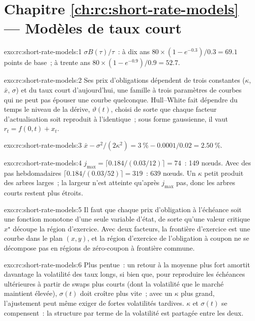 \section*{Chapitre \ref{ch:rc:short-rate-models} --- Modèles de taux court}

\begin{solution}{exo:rc:short-rate-models:1}
$\sigma B(\tau)/\tau$~: à dix ans $80\times(1-e^{-0.3})/0.3 = 69.1$ points de base~; à
trente ans $80\times(1-e^{-0.9})/0.9 = 52.7$.
\end{solution}

\begin{solution}{exo:rc:short-rate-models:2}
Ses prix d'obligations dépendent de trois constantes ($\kappa$, $\bar x$, $\sigma$) et du taux court
d'aujourd'hui, une famille à trois paramètres de courbes qui ne peut pas épouser une courbe quelconque.
Hull--White fait dépendre du temps le niveau de la dérive, $\vartheta(t)$, choisi de sorte
que chaque facteur d'actualisation soit reproduit à l'identique~; sous forme gaussienne, il vaut $r_t =
f(0,t)+x_t$.
\end{solution}

\begin{solution}{exo:rc:short-rate-models:3}
$\bar x-\sigma^2/(2\kappa^2) = 3~\%-0.0001/0.02 = 2.50~\%$.
\end{solution}

\begin{solution}{exo:rc:short-rate-models:4}
$j_{\max} = \lceil0.184/(0.03/12)\rceil = 74$~: 149 nœuds. Avec des pas
hebdomadaires $\lceil0.184/(0.03/52)\rceil = 319$~: 639 nœuds. Un $\kappa$ petit produit des arbres larges~; la
largeur n'est atteinte qu'après $j_{\max}$ pas, donc les arbres courts restent plus étroits.
\end{solution}

\begin{solution}{exo:rc:short-rate-models:5}
Il faut que chaque prix d'obligation à l'échéance soit une fonction monotone d'une seule
variable d'état, de sorte qu'une valeur critique $x^\star$ découpe la région d'exercice. Avec
deux facteurs, la frontière d'exercice est une courbe dans le plan $(x,y)$, et la
région d'exercice de l'obligation à coupon ne se décompose pas en régions
de zéro-coupon à frontière commune.
\end{solution}

\begin{solution}{exo:rc:short-rate-models:6}
Plus pentue~: un retour à la moyenne plus fort amortit davantage la volatilité des taux longs, si bien
que, pour reproduire les échéances ultérieures à partir de swaps plus courts (dont la volatilité
que le marché maintient élevée), $\sigma(t)$ doit croître plus vite~; avec un $\kappa$ plus grand, l'ajustement peut même exiger
de fortes volatilités tardives. $\kappa$ et $\sigma(t)$ se compensent~: la structure par terme de la
volatilité est partagée entre les deux.
\end{solution}

